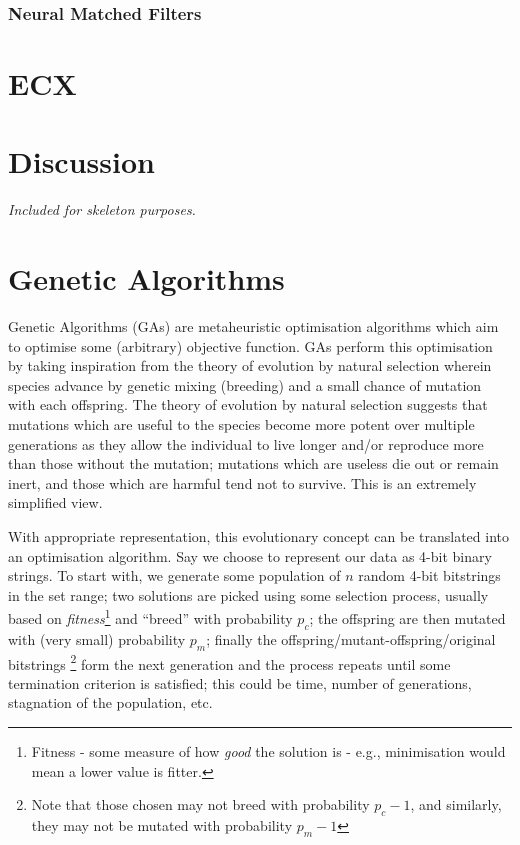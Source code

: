 \documentclass[a4paper,11pt,twoside,openright]{article}
\let\oldsection\section
\def\section{\cleardoublepage\oldsection}
\begin{document}
\subsubsection{Neural Matched Filters}


\section{ECX}

\newpage

\section{ Discussion }
\textit{Included for skeleton purposes.}
\newpage



\appendix
\section{Genetic Algorithms} \label{ap:ga}
Genetic Algorithms (GAs) are metaheuristic
optimisation algorithms which aim to optimise some (arbitrary) objective
function. GAs perform this optimisation by taking inspiration from the
theory of evolution by natural selection wherein species advance by genetic
mixing (breeding) and a small chance of mutation with each offspring.
The theory of evolution by natural selection suggests that mutations
which are useful to the species become more potent over multiple generations
as they allow the individual to live longer and/or reproduce more than those
without the mutation; mutations which are useless die out or remain inert, and
those which are harmful tend not to survive. This is an extremely simplified
view.
\newline
\par

With appropriate representation, this evolutionary concept can be
translated into an optimisation algorithm. Say we choose to represent our data as
4-bit binary strings. To start with, we generate some population of $n$ random
4-bit bitstrings in the set range; two solutions are picked using some selection
process, usually based on \textit{fitness}\footnote{Fitness - some measure of how
  \textit{good} the solution is - e.g., minimisation would mean a lower value is
  fitter.} and ``breed'' with probability $p_c$; the offspring are then mutated
with (very small) probability $p_m$; finally the
offspring/mutant-offspring/original bitstrings \footnote{Note that those chosen
  may not breed with probability $p_c - 1$, and
similarly, they may not be mutated with probability $p_m - 1$} form the next
generation and the process repeats until some termination criterion is satisfied;
this could be time, number of generations, stagnation of the population, etc.
\newline
\par
\end{document}
